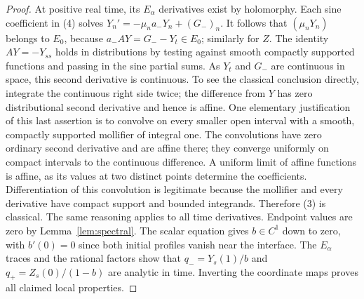 \documentclass[11pt]{article}
\begin{document}
\begin{proof}
At positive real time, its $E_\alpha$ derivatives exist by holomorphy.
Each sine coefficient in (4) solves
$Y_n'=-\mu_n a_-Y_n+(G_-)_n$.
It follows that $(\mu_nY_n)$ belongs to $E_0$, because
$a_-AY=G_--Y_t\in E_0$; similarly for $Z$.
The identity $AY=-Y_{ss}$ holds in distributions by testing against
smooth compactly supported functions and passing in the sine partial
sums. As $Y_t$ and $G_-$ are continuous in space, this second derivative
is continuous. To see the classical conclusion directly, integrate
the continuous right side twice; the difference from $Y$ has zero
distributional second derivative and hence is affine. One elementary
justification of this last assertion is to convolve on every smaller
open interval with a smooth, compactly supported mollifier of integral
one. The convolutions have zero ordinary second derivative and are
affine there; they converge uniformly on compact intervals to the
continuous difference. A uniform limit of affine functions is affine,
as its values at two distinct points determine the coefficients.
Differentiation of this convolution is legitimate because the
mollifier and every derivative have compact support and bounded
integrands. Therefore (3)
is classical. The same reasoning applies to all time derivatives.
Endpoint values are zero by Lemma~\ref{lem:spectral}. The scalar equation gives $b\in C^1$
down to zero, with $b'(0)=0$ since both initial profiles vanish near
the interface. The $E_\alpha$ traces and the rational factors show
that $q_-=Y_s(1)/b$ and $q_+=Z_s(0)/(1-b)$ are analytic in time.
Inverting the coordinate maps proves all claimed local properties.
\end{proof}
\end{document}
